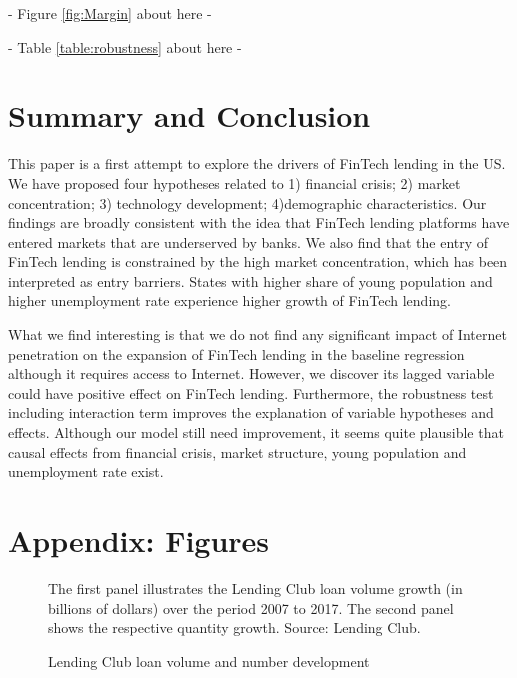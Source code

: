 \documentclass[11pt, a4paper, leqno]{article}
\begin{document}
\begin{center}
- Figure \ref{fig:Margin} about here -
\end{center}

\begin{center}
- Table \ref{table:robustness} about here -
\end{center}


\section{Summary and Conclusion}

This paper is a first attempt to explore the drivers of FinTech lending in the US. We have proposed four hypotheses related to 1) financial crisis; 2) market concentration; 3) technology development; 4)demographic characteristics. Our findings are broadly consistent with the idea that FinTech lending platforms have entered markets that are underserved by banks. We also find that the entry of FinTech lending is constrained by the high market concentration, which has been interpreted as entry barriers. States with higher share of young population and higher unemployment rate experience higher growth of FinTech lending.

What we find interesting is that we do not find any significant impact of Internet penetration on the expansion of FinTech lending in the baseline regression although it requires access to Internet. However, we discover its lagged variable could have positive effect on FinTech lending. Furthermore, the robustness test including interaction term improves the explanation of variable hypotheses and effects. Although our model still need improvement, it seems quite plausible that causal effects from financial crisis, market structure, young population and unemployment rate exist.

\nocite{*}

\newpage
\linespread{1.25}\selectfont
\setlength{\bibsep}{12pt}


\clearpage
{}
\section*{Appendix: Figures}

\begin{figure}[!h!]
\centering
\caption{Lending Club loan volume and number development}\label{fig:LC}
\vspace{0.25cm}
\hspace{0.5cm} \parbox{15cm}{\scriptsize The first panel illustrates the Lending Club loan volume growth (in billions of dollars) over the period 2007 to 2017. The second panel shows the respective quantity growth. Source: Lending Club.}
\end{figure}
\end{document}
